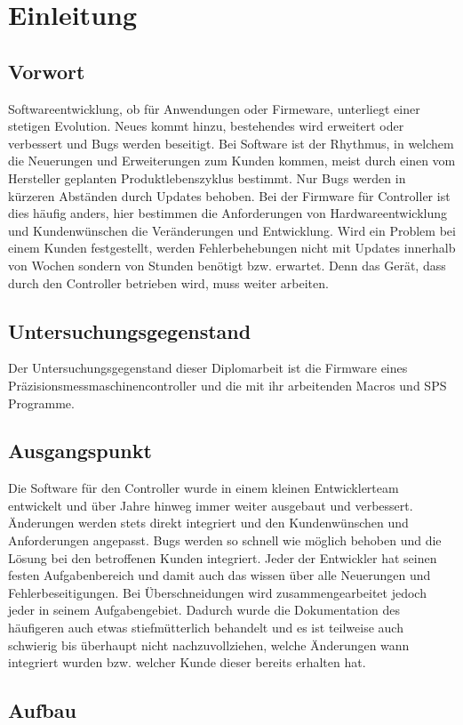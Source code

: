 \chapter{Einleitung}

\section{Vorwort}
Softwareentwicklung, ob für Anwendungen oder Firmeware, unterliegt einer stetigen Evolution. Neues kommt hinzu, bestehendes wird erweitert oder verbessert und Bugs werden beseitigt. 
Bei Software ist der Rhythmus, in welchem die Neuerungen und Erweiterungen zum Kunden kommen, meist durch einen vom Hersteller geplanten Produktlebenszyklus bestimmt. Nur Bugs werden in kürzeren Abständen durch Updates behoben.
Bei der Firmware für Controller ist dies häufig anders, hier bestimmen die Anforderungen von Hardwareentwicklung und Kundenwünschen die Veränderungen und Entwicklung. Wird ein Problem bei einem Kunden festgestellt, werden Fehlerbehebungen nicht mit Updates innerhalb von Wochen sondern von Stunden benötigt bzw. erwartet. Denn das Gerät, dass durch den Controller betrieben wird, muss weiter arbeiten.


\section{Untersuchungsgegenstand}
Der Untersuchungsgegenstand dieser Diplomarbeit ist die Firmware eines Präzisionsmessmaschinencontroller und die mit ihr arbeitenden Macros und SPS Programme.


\section{Ausgangspunkt}
Die Software für den Controller wurde in einem kleinen Entwicklerteam entwickelt und über Jahre hinweg immer weiter ausgebaut und verbessert. Änderungen werden stets direkt integriert und den Kundenwünschen und Anforderungen angepasst. Bugs werden so schnell wie möglich behoben und die Lösung bei den betroffenen Kunden integriert. Jeder der Entwickler hat seinen festen Aufgabenbereich und damit auch das wissen über alle Neuerungen und Fehlerbeseitigungen. Bei Überschneidungen wird zusammengearbeitet jedoch jeder in seinem Aufgabengebiet. Dadurch wurde die Dokumentation des häufigeren auch etwas stiefmütterlich behandelt und es ist teilweise auch schwierig bis überhaupt nicht nachzuvollziehen, welche Änderungen wann integriert wurden bzw. welcher Kunde dieser bereits erhalten hat. 

\section{Aufbau}

